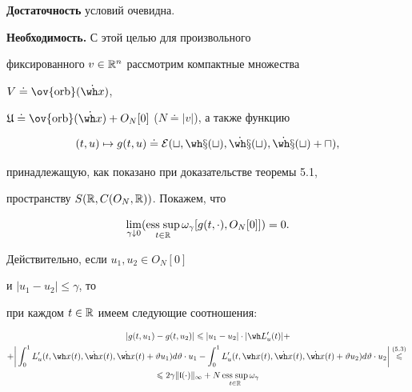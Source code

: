 \begin{pf}


{\bf Достаточность} условий очевидна.


\smallskip





{\bf Необходимость.} С этой целью для произвольного


фиксированного $v\in\Bbb R^n$ рассмотрим компактные множества


$V\doteq \ov{\orb}(\Dot{\wh x})$,


$\frak U\doteq \ov{\orb}(\Dot{\wh x})+O_N[0]$ ($N\doteq |v|$), а также функцию


$$


(t,u)\mapsto g(t,u)\doteq


\cal E(t,\wh x(t),\Dot {\wh x}(t),\Dot {\wh x}(t)+u),


$$


принадлежащую, как показано при доказательстве теоремы 5.1,


пространству $S(\Bbb R,C(O_N,\Bbb R))$. Покажем, что


\begin{equation}


\lim_{\gamma\downarrow 0}


(\esssup_{t\in\Bbb R}\omega_{\gamma}[g(t,\cdot),O_N[0]])=0.


\end{equation}


Действительно, если $u_1, u_2\in O_N[0]$


и $|u_1-u_2|\leqslant\gamma$, то


при каждом $t\in\Bbb R$ имеем следующие соотношения:


\begin{multline*}


|g(t,u_1)-g(t, u_2)|\leqslant |u_1- u_2|\cdot|\wh L'_{u}(t)|+\\


+\bigg|\int_0^1 L'_u(t,\wh x(t),\Dot{\wh x}(t),


\Dot{\wh x}(t)+\vartheta u_1)d\vartheta\cdot u_1-


\int_0^1 L'_u(t,\wh x(t),\Dot{\wh x}(t),


\Dot{\wh x}(t)+\vartheta u_2)d\vartheta\cdot


u_2\bigg|\up{(5.3)}{\leqslant}{} \\


\leqslant 2\gamma\|\frak l(\cdot)\|_\infty+N


\esssup_{t\in\Bbb R}\omega_{\gamma}



\end{multline*}
\end{pf}
